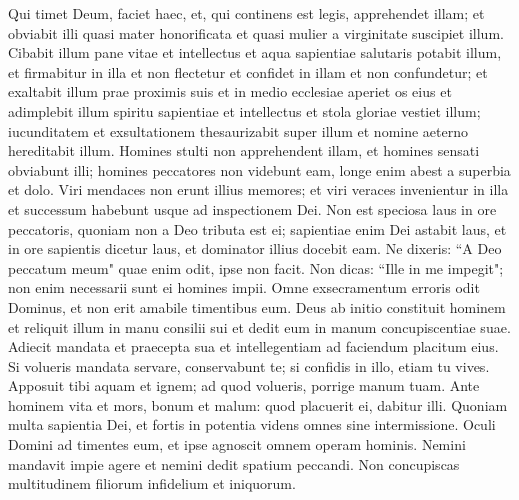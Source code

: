 \begin{biblechapter}  
\verse Qui timet Deum, faciet haec, et, qui continens est legis, apprehendet illam; 
\verse et obviabit illi quasi mater honorificata et quasi mulier a virginitate suscipiet illum. 
\verse Cibabit illum pane vitae et intellectus et aqua sapientiae salutaris potabit illum, et firmabitur in illa et non flectetur 
\verse et confidet in illam et non confundetur; et exaltabit illum prae proximis suis 
\verse et in medio ecclesiae aperiet os eius et adimplebit illum spiritu sapientiae et intellectus et stola gloriae vestiet illum; 
\verse iucunditatem et exsultationem thesaurizabit super illum et nomine aeterno hereditabit illum. 
\verse Homines stulti non apprehendent illam, et homines sensati obviabunt illi; homines peccatores non videbunt eam, longe enim abest a superbia et dolo. 
\verse Viri mendaces non erunt illius memores; et viri veraces invenientur in illa et successum habebunt usque ad inspectionem Dei. 
\verse Non est speciosa laus in ore peccatoris, 
\verse quoniam non a Deo tributa est ei; sapientiae enim Dei astabit laus, et in ore sapientis dicetur laus, et dominator illius docebit eam. 
\verse Ne dixeris: “A Deo peccatum meum" quae enim odit, ipse non facit. 
\verse Non dicas: “Ille in me impegit"; non enim necessarii sunt ei homines impii. 
\verse Omne exsecramentum erroris odit Dominus, et non erit amabile timentibus eum. 
\verse Deus ab initio constituit hominem et reliquit illum in manu consilii sui et dedit eum in manum concupiscentiae suae. 
\verse Adiecit mandata et praecepta sua et intellegentiam ad faciendum placitum eius. 
\verse Si volueris mandata servare, conservabunt te; si confidis in illo, etiam tu vives. 
\verse Apposuit tibi aquam et ignem; ad quod volueris, porrige manum tuam. 
\verse Ante hominem vita et mors, bonum et malum: quod placuerit ei, dabitur illi. 
\verse Quoniam multa sapientia Dei, et fortis in potentia videns omnes sine intermissione. 
\verse Oculi Domini ad timentes eum, et ipse agnoscit omnem operam hominis. 
\verse Nemini mandavit impie agere et nemini dedit spatium peccandi. 
\verse Non concupiscas multitudinem filiorum infidelium et iniquorum. 
\end{biblechapter}

